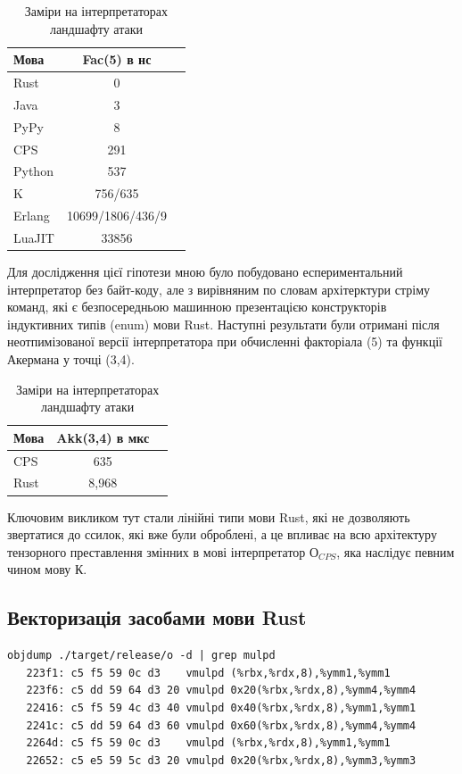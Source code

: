 \begin{table}
 \caption{Заміри на інтерпретаторах ландшафту атаки}
  \begin{tabular}{lcc}
    \hline
    \textbf{Мова} & \textbf{Fac(5) в нс} \\
    \hline
    Rust    & 0 \\
    Java    & 3 \\
    PyPy    & 8 \\
    \hline
    \rowcolor{LightGray}
    CPS     & 291 \\
    \hline
    Python  & 537 \\
    K       & 756/635 \\
    \hline
    \rowcolor{LightGray}
    Erlang  & 10699/1806/436/9 \\
    \hline
    LuaJIT  & 33856 \\
    \hline
  \end{tabular}
\end{table}

Для дослідження цієї гіпотези мною було побудовано еспериментальний інтерпретатор
без байт-коду, але з вирівняним по словам архітерктури стріму команд, які є
безпосередньою машинною презентацією конструкторів індуктивних типів (enum) мови Rust.
Наступні результати були отримані після неотпимізованої версії інтерпретатора
при обчисленні факторіала (5) та функції Акермана у точці (3,4).

\begin{table}
 \caption{Заміри на інтерпретаторах ландшафту атаки}
  \begin{tabular}{lcc}
    \hline
    \textbf{Мова} & \textbf{Akk(3,4) в мкс} \\
    \hline
    \rowcolor{LightGray}
CPS & 635 \\
    \hline
Rust  & 8,968 \\
    \hline
  \end{tabular}
\end{table}

Ключовим викликом тут стали лінійні типи мови Rust, які не дозволяють
звертатися до ссилок, які вже були оброблені, а це впливає на всю
архітектуру тензорного преставлення змінних в мові інтерпретатор $О_{CPS}$,
яка наслідує певним чином мову К.

\newpage
\subsection{Векторизація засобами мови Rust}

\begin{lstlisting}
objdump ./target/release/o -d | grep mulpd
   223f1: c5 f5 59 0c d3    vmulpd (%rbx,%rdx,8),%ymm1,%ymm1
   223f6: c5 dd 59 64 d3 20 vmulpd 0x20(%rbx,%rdx,8),%ymm4,%ymm4
   22416: c5 f5 59 4c d3 40 vmulpd 0x40(%rbx,%rdx,8),%ymm1,%ymm1
   2241c: c5 dd 59 64 d3 60 vmulpd 0x60(%rbx,%rdx,8),%ymm4,%ymm4
   2264d: c5 f5 59 0c d3    vmulpd (%rbx,%rdx,8),%ymm1,%ymm1
   22652: c5 e5 59 5c d3 20 vmulpd 0x20(%rbx,%rdx,8),%ymm3,%ymm3
\end{lstlisting}

